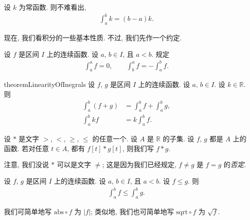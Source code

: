 \begin{example}
    设 $k$ 为常函数.
    则不难看出,
    \begin{align*}
        \int_{a}^{b} {k} = (b - a)k.
    \end{align*}
\end{example}

现在, 我们看积分的一些基本性质.
不过, 我们先作一个约定.

\begin{definition}
    设 $f$ 是区间 $I$ 上的连续函数.
    设 $a$, $b \in I$, 且 $a < b$.
    规定
    \begin{align*}
        \int_{a}^{a} {f} = 0, \qquad \int_{b}^{a} {f} = -\int_{a}^{b} {f}.
    \end{align*}
\end{definition}

\begin{restatable}{theorem}{LinearityOfInegrals}
    设 $f$, $g$ 是区间 $I$ 上的连续函数.
    设 $a$, $b \in I$.
    设 $k \in \mathbb{R}$. 则
    \begin{align*}
        \int_{a}^{b} {(f + g)} & = \int_{a}^{b} {f} + \int_{a}^{b} {g}, \\
        \int_{a}^{b} {kf}      & = k \int_{a}^{b} {f}.
    \end{align*}
\end{restatable}

\begin{definition}
    设 $\ast$ 是文字 $>$, $<$, $\geq$, $\leq$ 的任意一个.
    设 $A$ 是 $\mathbb{R}$ 的子集.
    设 $f$, $g$ 都是 $A$ 上的函数.
    若对任意 $t \in A$, 都有 $f[t] \ast g[t]$,
    则我们写 $f \ast g$.
\end{definition}

\begin{remark}
    注意, 我们没说 $\ast$ 可以是文字 $\neq$;
    这是因为我们已经规定, $f \neq g$ 是 $f = g$ 的\emph{否定}.
\end{remark}

\begin{theorem}
    设 $f$, $g$ 是区间 $I$ 上的连续函数.
    设 $a$, $b \in I$, 且 $a < b$.
    设 $f \leq g$.
    则
    \begin{align*}
        \int_{a}^{b} {f} \leq \int_{a}^{b} {g}.
    \end{align*}
\end{theorem}

\begin{definition}
    我们可简单地写 $\mathrm{abs} \circ f$ 为 $|f|$;
    类似地, 我们也可简单地写 $\mathrm{sqrt} \circ f$
    为 $\sqrt{f}$.
\end{definition}

